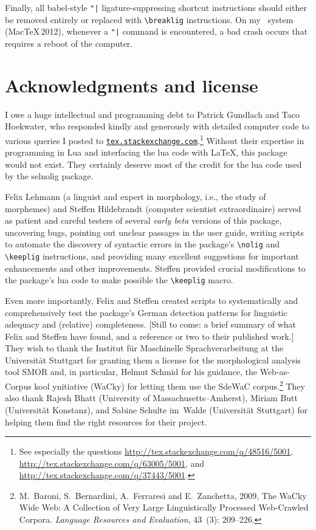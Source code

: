 \documentclass[12pt]{article}
\newcommand{\pkg}[1]{\textsf{#1}}
\newcommand{\cmmd}[1]{\texttt{\textbackslash #1}}
\begin{document}
Finally, all \pkg{babel}-style \Verb+"|+ ligature-suppressing shortcut instructions should either be removed entirely or replaced with \Verb+\breaklig+ instructions. On my \LuaLaTeX\ system (MacTeX\,2012), whenever a \Verb+"|+ command is encountered, a bad crash occurs that requires a reboot of the computer.


\section{Acknowledgments and license}

I owe a huge intellectual and programming debt to Patrick Gundlach and Taco Hoekwater, who responded kindly and generously with detailed computer code to various queries I posted to \href{http://tex.stackexchange.com}{\texttt{tex.stackexchange.com}}.\footnote{See especially the questions \url{http://tex.stackexchange.com/q/48516/5001}, \url{http://tex.stackexchange.com/q/63005/5001}, and
\url{http://tex.stackexchange.com/q/37443/5001}.} Without their expertise in programming in Lua and interfacing the lua code with \LaTeX, this package would not exist. They certainly deserve most of the credit for the lua code used by the \pkg{selnolig} package.

Felix Lehmann (a linguist and expert in morphology, i.e., the study of morphemes) and Steffen Hildebrandt (computer scientist extraordinaire) served as patient and careful testers of several \emph{early beta} versions of this package, uncovering bugs, pointing out unclear passages in the user guide, writing scripts to automate the discovery of syntactic errors in the package's \cmmd{nolig} and \cmmd{keeplig} instructions, and providing many excellent suggestions for important enhancements and other improvements. Steffen provided crucial modifications to the package's lua code to make possible the \cmmd{keeplig} macro. 

Even more importantly, Felix and Steffen created scripts to systematically and comprehensively test the package's German detection patterns for linguistic adequacy and (relative) completeness.
[Still to come: a brief summary of what Felix and Steffen have found, and a reference or two to their published work.] They wish to thank the Institut für Maschinelle Sprachverarbeitung at the Universität Stuttgart for granting them a license for the morphological analysis tool SMOR and, in particular, Helmut Schmid for his guidance, the Web-as-Corpus kool ynitiative (WaCky) for letting them use the SdeWaC corpus.\footnote{M.~Baroni, S.~Bernardini, A.~Ferraresi and E.~Zanchetta, 2009, The WaCky Wide Web: A Collection of Very Large Linguistically Processed Web-Crawled Corpora. \emph{Language Resources and Evaluation}, 43~(3): 209--226.} They also thank Rajesh Bhatt (University of Massachusetts--Amherst), Miriam Butt (Universität Konstanz), and Sabine Schulte im~Walde (Universität Stuttgart) for helping them find the right resources for their project.
\end{document}
